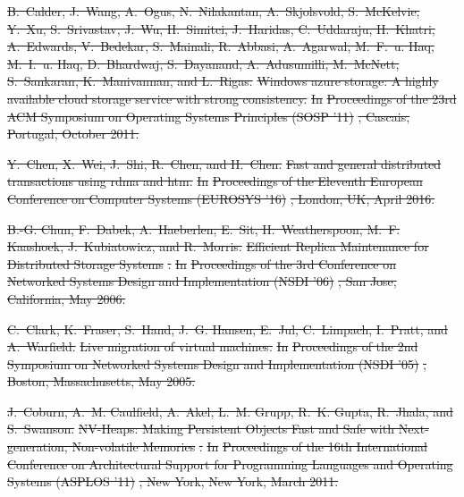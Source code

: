\documentclass[sigconf]{acmart}
\renewcommand{\em}{\it}
\providecommand{\DIFdel}[1]{{\protect\color{red}\sout{#1}}}                      %
\begin{document}
{%
\DIFdel{B.~Calder, J.~Wang, A.~Ogus, N.~Nilakantan, A.~Skjolsvold, S.~McKelvie, Y.~Xu,
  S.~Srivastav, J.~Wu, H.~Simitci, J.~Haridas, C.~Uddaraju, H.~Khatri,
  A.~Edwards, V.~Bedekar, S.~Mainali, R.~Abbasi, A.~Agarwal, M.~F.~u. Haq,
  M.~I.~u. Haq, D.~Bhardwaj, S.~Dayanand, A.~Adusumilli, M.~McNett,
  S.~Sankaran, K.~Manivannan, and L.~Rigas.
}%
\DIFdel{Windows azure storage: A highly available cloud storage service with
  strong consistency.
}%
\DIFdel{In }%
\DIFdel{Proceedings of the 23rd ACM Symposium on Operating Systems
  Principles (SOSP '11)}%
\DIFdel{, Cascais, Portugal, October 2011.
}%

\DIFdel{Y.~Chen, X.~Wei, J.~Shi, R.~Chen, and H.~Chen.
}%
\DIFdel{Fast and general distributed transactions using rdma and htm.
}%
\DIFdel{In }%
\DIFdel{Proceedings of the Eleventh European Conference on Computer
  Systems (EUROSYS ’16)}%
\DIFdel{, London, UK, April 2016.
}%

\DIFdel{B.-G. Chun, F.~Dabek, A.~Haeberlen, E.~Sit, H.~Weatherspoon, M.~F. Kaashoek,
  J.~Kubiatowicz, and R.~Morris.
}%
\DIFdel{Efficient Replica Maintenance for Distributed Storage Systems}%
\DIFdel{.
}%
\DIFdel{In }%
\DIFdel{Proceedings of the 3rd Conference on Networked Systems Design
  and Implementation (NSDI ’06)}%
\DIFdel{, San Jose, California, May 2006.
}%

\DIFdel{C.~Clark, K.~Fraser, S.~Hand, J.~G. Hansen, E.~Jul, C.~Limpach, I.~Pratt, and
  A.~Warfield.
}%
\DIFdel{Live migration of virtual machines.
}%
\DIFdel{In }%
\DIFdel{Proceedings of the 2nd Symposium on Networked Systems Design
  and Implementation (NSDI '05)}%
\DIFdel{, Boston, Massachusetts, May 2005.
}%

\DIFdel{J.~Coburn, A.~M. Caulfield, A.~Akel, L.~M. Grupp, R.~K. Gupta, R.~Jhala, and
  S.~Swanson.
}%
\DIFdel{NV-Heaps: Making Persistent Objects Fast and Safe with
  Next-generation, Non-volatile Memories}%
\DIFdel{.
}%
\DIFdel{In }%
\DIFdel{Proceedings of the 16th International Conference on
  Architectural Support for Programming Languages and Operating Systems (ASPLOS
  '11)}%
\DIFdel{, New York, New York, March 2011.
}%

}
\end{document}
